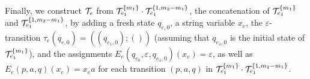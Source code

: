 Finally, we construct $\mathcal{T}_e$ from $\mathcal{T}^{\{m_1\}}_{e_1} \cdot \mathcal{T}^{\{1,m_2-m_1\}}_{e_1}$, the concatenation of $\mathcal{T}^{\{m_1\}}_{e_1}$ and $\mathcal{T}^{\{1,m_2-m_1\}}_{e_1}$, by adding a fresh state $q_{e,0}$, a string variable $x_e$, the $\varepsilon$-transition $\tau_e(q_{e,0}) = ((q_{e_1,0});())$ (assuming that $q_{e_1,0}$ is the initial state of $\mathcal{T}^{\{m_1\}}_{e_1}$),  and the assignments $E_e(q_{e_0}, \varepsilon, q_{e_1,0})(x_e) = \varepsilon$, as well as $E_e(p, a, q)(x_e) = x_e a$ for each transition $(p, a, q)$ in  $\mathcal{T}^{\{m_1\}}_{e_1} \cdot \mathcal{T}^{\{1,m_2-m_1\}}_{e_1}$.

%
%		
%
% 
